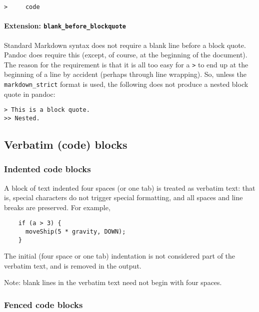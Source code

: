 \documentclass[]{article}
\begin{document}
\begin{verbatim}
>     code
\end{verbatim}

\hypertarget{extension-blank_before_blockquote}{%
\paragraph{\texorpdfstring{Extension:
\texttt{blank\_before\_blockquote}}{Extension: blank\_before\_blockquote}}\label{extension-blank_before_blockquote}}

Standard Markdown syntax does not require a blank line before a block
quote. Pandoc does require this (except, of course, at the beginning of
the document). The reason for the requirement is that it is all too easy
for a \texttt{\textgreater{}} to end up at the beginning of a line by
accident (perhaps through line wrapping). So, unless the
\texttt{markdown\_strict} format is used, the following does not produce
a nested block quote in pandoc:

\begin{verbatim}
> This is a block quote.
>> Nested.
\end{verbatim}

\hypertarget{verbatim-code-blocks}{%
\subsection{Verbatim (code) blocks}\label{verbatim-code-blocks}}

\hypertarget{indented-code-blocks}{%
\subsubsection{Indented code blocks}\label{indented-code-blocks}}

A block of text indented four spaces (or one tab) is treated as verbatim
text: that is, special characters do not trigger special formatting, and
all spaces and line breaks are preserved. For example,

\begin{verbatim}
    if (a > 3) {
      moveShip(5 * gravity, DOWN);
    }
\end{verbatim}

The initial (four space or one tab) indentation is not considered part
of the verbatim text, and is removed in the output.

Note: blank lines in the verbatim text need not begin with four spaces.

\hypertarget{fenced-code-blocks}{%
\subsubsection{Fenced code blocks}\label{fenced-code-blocks}}
\end{document}
